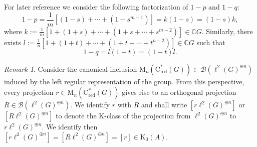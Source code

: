 \documentclass[a4paper,leqno,12pt]{article}
\numberwithin{equation}{section}
\theoremstyle{plain}
\theoremstyle{definition}
\theoremstyle{remark}
\newtheorem{remark}[theoremcounter]{Remark}
\newcommand{\Csr}{\mathrm{C}^*_{\text{red}}}
\begin{document}
	
	For later reference we consider the following factorization of $1-p$ and $1-q$:
	\begin{equation}
		\label{eq3}
		1-p = \frac{1}{m}[(1-s)+\cdots+(1-s^{m-1})] =
		k(1-s)=(1-s)k,
	\end{equation}
	where $k:=\frac1{m}[1+(1+s)+\cdots+(1+s+\cdots+s^{m-2})]\in\mathbb C G$.
	Similarly, there exists $l:=\frac1{n}[1+(1+t)+\cdots+(1+t+\cdots+t^{n-2})]\in\mathbb C G$ such that 
	\begin{equation}
		\label{eq4}
		1-q = l(1-t)=(1-t)l.
	\end{equation}
		
	\begin{remark}\label{rem:identification}
	Consider the canonical inclusion 
	$\mathrm M_n(\Csr(G))\subset\mathcal{B}(\ell^2(G)^{\oplus n})$ induced by the left regular representation of the group. 
	From this perspective, every projection $r \in \mathrm M_n(\Csr(G))$ gives rise to an orthogonal projection $R \in \mathcal B(\ell^2(G)^{\oplus n})$.
	We identify $r$ with $R$ and  
	shall write $[r\ell^2(G)^{\oplus n}]$ or $[R\ell^2(G)^{\oplus n}]$ to denote the K-class of the projection from $\ell^2(G)^{\oplus n}$ to $r\ell^2(G)^{\oplus n}$. We identify then $[r\ell^2(G)^{\oplus n}]=[R\ell^2(G)^{\oplus n}]=[r]\in \mathrm K_0(A)$.
	\end{remark}
 
\end{document}
